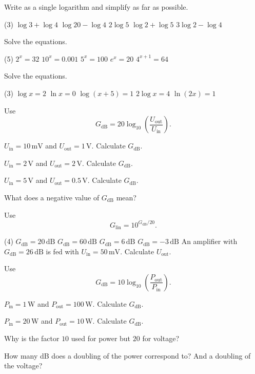 Write as a single logarithm and simplify as far as possible.
\begin{delar}(3)
  \task $\log 3 + \log 4$
  \task $\log 20 - \log 4$
  \task $2\log 5$
  \task $\log 2 + \log 5$
  \task $3\log 2 - \log 4$
\end{delar}

Solve the equations.
\begin{delar}(5)
  \task $2^x = 32$
  \task $10^x = 0.001$
  \task $5^x = 100$
  \task $e^x = 20$
  \task $4^{x+1} = 64$
\end{delar}

Solve the equations.
\begin{delar}(3)
  \task $\log x = 2$
  \task $\ln x = 0$
  \task $\log(x + 5) = 1$
  \task $2\log x = 4$
  \task $\ln(2x) = 1$
\end{delar}

Use
\[
  G_{\text{dB}} = 20\log_{10}\left(\frac{U_{\text{out}}}{U_{\text{in}}}\right).
\]
\begin{parts}
  \item $U_{\text{in}} = 10\,\text{mV}$ and $U_{\text{out}} = 1\,\text{V}$. Calculate
    $G_{\text{dB}}$.
  \item $U_{\text{in}} = 2\,\text{V}$ and $U_{\text{out}} = 2\,\text{V}$. Calculate
    $G_{\text{dB}}$.
  \item $U_{\text{in}} = 5\,\text{V}$ and $U_{\text{out}} = 0.5\,\text{V}$. Calculate
    $G_{\text{dB}}$.
  \item What does a negative value of $G_{\text{dB}}$ mean?
\end{parts}

Use
\[
  G_{\text{lin}} = 10^{G_{\text{dB}}/20}.
\]
\begin{delar}(4)
  \task $G_{\text{dB}} = 20\,\text{dB}$
  \task $G_{\text{dB}} = 60\,\text{dB}$
  \task $G_{\text{dB}} = 6\,\text{dB}$
  \task $G_{\text{dB}} = -3\,\text{dB}$
  \task* An amplifier with $G_{\text{dB}} = 26\,\text{dB}$ is fed with
    $U_{\text{in}} = 50\,\text{mV}$. Calculate $U_{\text{out}}$.
\end{delar}

Use
\[
  G_{\text{dB}} = 10\log_{10}\left(\frac{P_{\text{out}}}{P_{\text{in}}}\right).
\]
\begin{parts}
  \item $P_{\text{in}} = 1\,\text{W}$ and $P_{\text{out}} = 100\,\text{W}$. Calculate
    $G_{\text{dB}}$.
  \item $P_{\text{in}} = 20\,\text{W}$ and $P_{\text{out}} = 10\,\text{W}$. Calculate
    $G_{\text{dB}}$.
  \item Why is the factor $10$ used for power but $20$ for voltage?
  \item How many dB does a doubling of the power correspond to? And a doubling of the voltage?
\end{parts}

